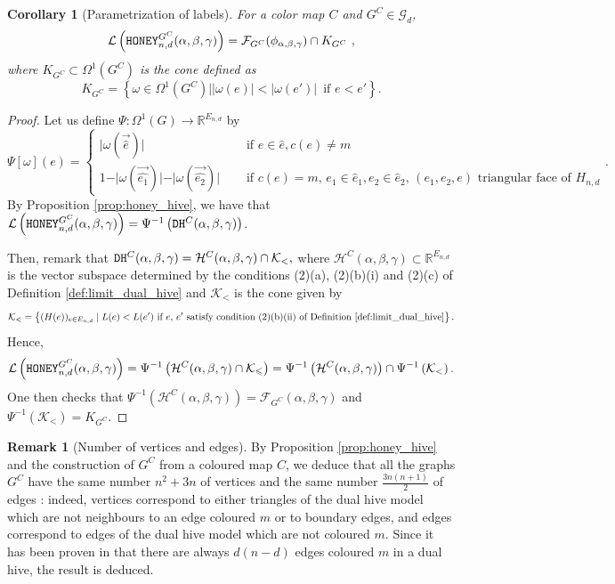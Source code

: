 \documentclass[11pt,a4paper]{amsart}
\providecommand{\R}{\mathbb R}
\providecommand{\honey}{\texttt{\textsc{HONEY}}}
\providecommand{\dualhive}{\texttt{\textsc{DH}}}
\numberwithin{equation}{section}
\newtheorem{corollary}[theorem]{Corollary}
\theoremstyle{definition}
\newtheorem{remark}[theorem]{Remark}
\begin{document}
\begin{corollary}[Parametrization of labels]
    \label{cor:paramietrization_label}
    For a color map $C$ and $G^C\in \mathcal{G}_d$,
    $$\mathcal{L} \left(\honey_{n,d}^{G^C}(\alpha,\beta,\gamma) \right) 
    = \mathcal{F}_{G^C}(\phi_{\alpha,\beta,\gamma})\cap K_{G^C} \ ,$$
    where $K_{G^C}\subset \Omega^1(G^C)$ is the cone defined as 
    $$K_{G^C} = \left\{\omega \in \Omega^1(G^C) \mid 
    \vert \omega(e)\vert<\vert \omega(e')\vert\,\text{ if } e<e' \right\}.$$ 
\end{corollary}

\begin{proof}
    Let us define $\Psi: \Omega^1(G) \to \R^{E_{n, d}}$ by 
    $$\Psi[\omega](e)=\left\lbrace\begin{aligned} \vert \omega(\vec{\hat{e}})\vert 
        \quad &\text{ if }e\in \hat{e}, c(e)\not=m\\
    1-\vert \omega(\vec{\hat{e_1}})\vert-\vert \omega(\vec{\hat{e_2}})\vert 
    \quad &\text{ if }c(e)=m,\,e_1\in\hat{e}_1,e_2\in\hat{e}_2 ,\,(e_1,e_2,e) 
    \text{ triangular face of }H_{n,d}\end{aligned}\right..$$
    By Proposition \ref{prop:honey_hive}, we have that  
    $\mathcal{L} \left(\honey_{n,d}^{G^C}(\alpha,\beta,\gamma) \right) 
    = \Psi^{-1} \left(\dualhive^C(\alpha,\beta,\gamma)\right)$.

    \noindent
    Then, remark that $\dualhive^C(\alpha,\beta,\gamma) 
    = \mathcal{H}^C(\alpha,\beta,\gamma) \cap \mathcal{K}_{<},$ 
    where $\mathcal{H}^C(\alpha,\beta,\gamma)\subset \mathbb{R}^{E_{n,d}}$ 
    is the vector subspace determined by the conditions 
    (2)(a), (2)(b)(i) and (2)(c) of Definition \ref{def:limit_dual_hive} 
    and $\mathcal{K}_{<}$ is the cone given by 
    $$\mathcal{K}_{<} = \left\{(H(e))_{e\in E_{n,d}} \mid L(e)< L(e')\text{ if } e ,\,e' 
    \text{ satisfy condition (2)(b)(ii) of Definition \ref{def:limit_dual_hive}} \right\}.$$
    Hence, 
    $$\mathcal{L}\left(\honey_{n,d}^{G^C}(\alpha,\beta,\gamma)\right) = 
    \Psi^{-1} \left(\mathcal{H}^C(\alpha,\beta,\gamma) \cap \mathcal{K}_{\leqslant} \right)
    =\Psi^{-1}\left(\mathcal{H}^C(\alpha,\beta,\gamma)\right) \cap 
    \Psi^{-1}\left(\mathcal{K}_{<}\right).$$
    One then checks that $\Psi^{-1}(\mathcal{H}^C(\alpha,\beta,\gamma)) = 
    \mathcal{F}_{G^C}(\alpha,\beta,\gamma)$ 
    and $\Psi^{-1}(\mathcal{K}_{<})=K_{G^C}$. 
\end{proof}


\begin{remark}[Number of vertices and edges]\label{rmk:graph_vertices_edges}
By Proposition \ref{prop:honey_hive} and the construction of $G^C$ from a coloured map $C$, we deduce that all the graphs $G^C$ have the same number $n^2+3n$ of vertices and the same number $\frac{3n(n+1)}{2}$ of edges : indeed, vertices correspond to either triangles of the dual hive model which are not neighbours to an edge coloured $m$ or to boundary edges, and edges correspond to edges of the dual hive model which are not coloured $m$. Since it has been proven in \cite{françois2024positiveformulaproductconjugacy} that there are always $d(n-d)$ edges coloured $m$ in a dual hive, the result is deduced.
\end{remark}
\end{document}
